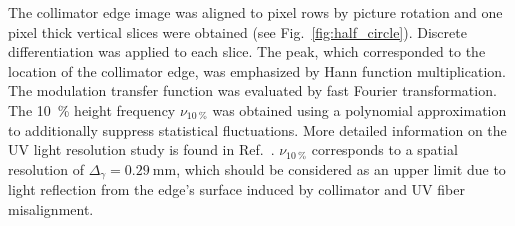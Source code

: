 \documentclass[preprint,3p,twocolumn]{elsarticle}
\begin{document}
The collimator edge image was aligned to pixel rows by picture
%
%
%
%
rotation and one pixel thick vertical slices were obtained (see
Fig.~\ref{fig:half_circle}).  Discrete differentiation was
applied to each slice.  The peak, which corresponded to the
location of the collimator edge, was emphasized by Hann function
%
%
%
%
multiplication.  The modulation transfer function was evaluated
by fast Fourier transformation.  The \SI{10}{\percent} height
frequency $\nu_{\SI{10}{\percent}}$ was obtained using a polynomial
approximation to additionally suppress statistical fluctuations.
More detailed information on the UV light resolution study is
found in Ref.~\cite{Gosha}.  $\nu_{\SI{10}{\percent}}$
corresponds to a spatial resolution of
$\Delta_\gamma = \SI{0.29}{\mm}$, which should be considered as
an upper limit due to light reflection from the edge's surface
induced by collimator and UV fiber misalignment.
\end{document}
